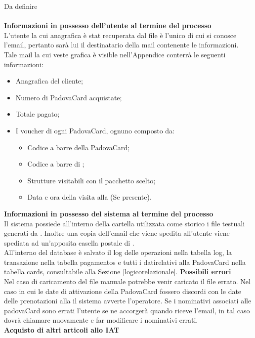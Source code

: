 Da definire\\ \\ %
\textbf{Informazioni in possesso dell'utente al termine del processo} \\

L'utente la cui anagrafica è stat recuperata dal file \tlite è l'unico di cui si conosce l'email, pertanto sarà lui il destinatario della mail contenente le informazioni. Tale mail la cui veste grafica è visible nell'Appendice %
conterrà le seguenti informazioni:
\begin{itemize}
\item Anagrafica del cliente;
\item Numero di PadovaCard acquistate;
\item Totale pagato;
\item I voucher di ogni PadovaCard, ognuno composto da:
	\begin{itemize}
		\item Codice a barre della PadovaCard;
        \item Codice a barre di \tlite;
        \item Strutture visitabili con il pacchetto scelto;
        \item Data e ora della visita alla \cappella (Se presente).
	\end{itemize}
\end{itemize}
\textbf{Informazioni in possesso del sistema al termine del processo} \\

Il sistema possiede all'interno della cartella utilizzata come storico i file testuali generati da \tlite. Inoltre una copia dell'email che viene spedita all'utente viene spediata ad un'apposita casella postale di \net. \\

All'interno del database è salvato il log delle operazioni nella tabella log, la transazione nella tabella pagamentos e tutti i datirelativi alla PadovaCard nella tabella cards, consultabile alla Sezione \ref{logicorelazionale}.
\textbf{Possibili errori} \\

Nel caso di caricamento del file manuale potrebbe venir caricato il file errato.
Nel caso in cui le date di attivazione della PadovaCard fossero discordi con le date delle prenotazioni alla \cappella il sistema avverte l'operatore.
Se i nominativi associati alle padovaCard sono errati l'utente se ne accorgerà quando riceve l'email, in tal caso dovrà chiamare nuovamente e far modificare i nominativi errati.\\ 
\textbf{Acquisto di altri articoli allo IAT} \\

